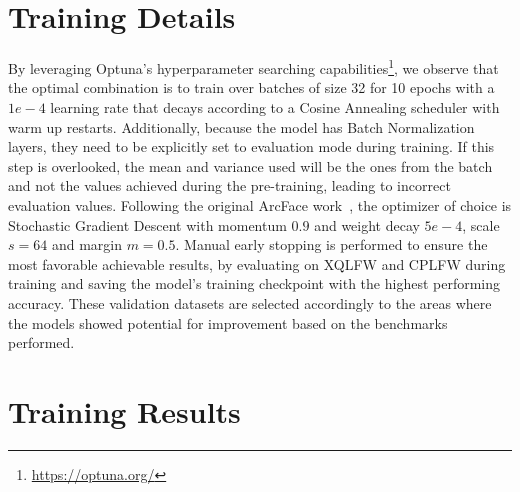 \documentclass[class=report, crop=false, a4paper, 12pt]{standalone}
\begin{document}
\section{Training Details}
By leveraging Optuna's hyperparameter searching capabilities\footnote{\url{https://optuna.org/}}, we observe that the optimal combination is to train over batches of size 32 for 10 epochs with a $1e-4$ learning rate that decays according to a Cosine Annealing scheduler with warm up restarts. Additionally, because the model has Batch Normalization layers, they need to be explicitly set to evaluation mode during training. If this step is overlooked, the mean and variance used will be the ones from the batch and not the values achieved during the pre-training, leading to incorrect evaluation values. Following the original ArcFace work~\autocite{dengArcFaceAdditiveAngular}, the optimizer of choice is Stochastic Gradient Descent with momentum $0.9$ and weight decay $5e-4$, scale $s=64$ and margin $m=0.5$. Manual early stopping is performed to ensure the most favorable achievable results, by evaluating on XQLFW and CPLFW during training and saving the model's training checkpoint with the highest performing accuracy. These validation datasets are selected accordingly to the areas where the models showed potential for improvement based on the benchmarks performed.

\section{Training Results}
\end{document}
